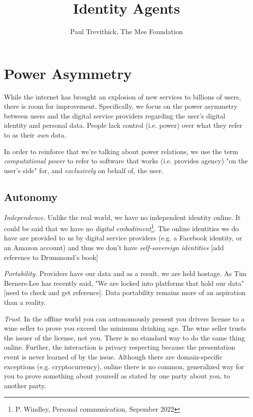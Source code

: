 \documentclass[11pt, oneside]{article}   	%
\title{Identity Agents}
\author{Paul Trevithick, The Mee Foundation}
\begin{document}
\maketitle
\section{Power Asymmetry}
While the internet has brought an explosion of new services to billions of users, there is room for improvement. Specifically, we focus on the power asymmetry between users and the digital service providers regarding the user's digital identity and personal data. People lack control (i.e. power) over what they refer to as their \emph{own} data. 

In order to reinforce that we're talking about power relations, we use the term \emph{computational power} to refer to software that works (i.e. provides agency) "on the user's side" for, and \emph{exclusively} on behalf of, the user. 

\subsection{Autonomy}

\emph{Independence}. Unlike the real world, we have no independent identity online. It could be said that we have no \emph{digital embodiment}\footnote{P. Windley, Personal communication, Sepember 2022}. The online identities we do have are provided to us by digital service providers (e.g. a Facebook identity, or an Amazon account) and thus we don't have  \emph{self-sovereign identities} [add reference to Drummond's book] 

\emph{Portability}. Providers have our data and as a result, we are held hostage. As Tim Berners-Lee has recently said, "We are locked into platforms that hold our data" [need to check and get reference]. Data portability remains more of an aspiration than a reality.

\emph{Trust}. In the offline world you can autonomously present you drivers license to a wine seller to prove you exceed the minimum drinking age. The wine seller trusts the issuer of the license, not you. There is no standard way to do the same thing online. Further, the interaction is privacy respecting because the presentation event is never learned of by the issue. Although there are domain-specific exceptions (e.g. cryptocurrency), online there is no common, generalized way for you to prove something about yourself as stated by one party about you, to another party.
\end{document}
